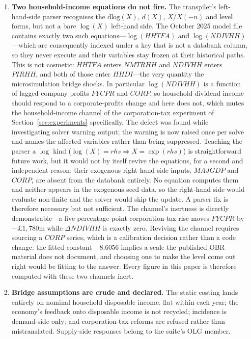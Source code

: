\begin{enumerate}
\item \textbf{Two household-income equations do not fire.} The transpiler's left-hand-side parser recognises the $\mathrm{dlog}(X)$, $d(X)$, $X/X(-n)$ and level forms, but not a bare $\log(X)$ left-hand side. The October 2025 model file contains exactly two such equations---$\log(HHTFA)$ and $\log(NDIVHH)$---which are consequently indexed under a key that is not a databank column, so they never execute and their variables stay frozen at their historical paths. This is not cosmetic: $HHTFA$ enters $NMTRHH$ and $NDIVHH$ enters $PIRHH$, and both of those enter $HHDI$---the very quantity the microsimulation bridge shocks. In particular $\log(NDIVHH)$ is a function of lagged company profits $FYCPR$ and $CORP$, so household dividend income should respond to a corporate-profits change and here does not, which mutes the household-income channel of the corporation-tax experiment of Section~\ref{sec:experiments} specifically. The defect was found while investigating solver warning output; the warning is now raised once per solve and names the affected variables rather than being suppressed. Teaching the parser a $\log$ kind ($\log(X)=\mathit{rhs} \Rightarrow X=\exp(\mathit{rhs})$) is straightforward future work, but it would not by itself revive the equations, for a second and independent reason: their exogenous right-hand-side inputs, $MAJGDP$ and $CORP$, are absent from the databank entirely. No equation computes them and neither appears in the exogenous seed data, so the right-hand side would evaluate non-finite and the solver would skip the update. A parser fix is therefore necessary but not sufficient. The channel's inertness is directly demonstrable---a five-percentage-point corporation-tax rise moves $FYCPR$ by $-\pounds1{,}780$m while $\Delta NDIVHH$ is exactly zero. Reviving the channel requires sourcing a $CORP$ series, which is a calibration decision rather than a code change: the fitted constant $-8.6056$ implies a scale the published OBR material does not document, and choosing one to make the level come out right would be fitting to the answer. Every figure in this paper is therefore computed with these two channels inert.

\item \textbf{Bridge assumptions are crude and declared.} The static costing lands entirely on nominal household disposable income, flat within each year; the economy's feedback onto disposable income is not recycled; incidence is demand-side only; and corporation-tax reforms are refused rather than mistranslated. Supply-side responses belong to the suite's OLG member.


\end{enumerate}
